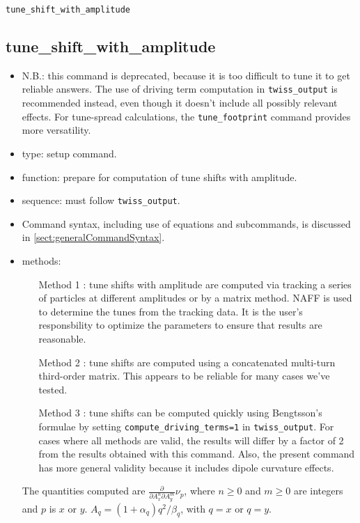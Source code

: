 \documentclass[11pt]{article}
\begin{document}
\newpage
\begin{center}{\Large\verb|tune_shift_with_amplitude|}\end{center}
\subsection{tune\_shift\_with\_amplitude \label{subsec:tuneshiftwithamplitude}}

\begin{itemize}
\item N.B.: this command is deprecated, because it is too difficult to tune it to get
  reliable answers. The use of driving term computation in \verb|twiss_output| is recommended instead, even though it 
  doesn't include all possibly relevant effects. For tune-spread calculations, the \verb|tune_footprint| command provides
  more versatility.
\item type: setup command.
\item function: prepare for computation of tune shifts with amplitude.
\item sequence: must follow \verb|twiss_output|.
\item Command syntax, including use of equations and subcommands, is discussed in \ref{sect:generalCommandSyntax}.
\item methods: 
\begin{itemize}
 \item[Method 1]: tune shifts with amplitude are computed via tracking a series of
  particles at different amplitudes or by a matrix method.  NAFF is used to 
  determine the tunes from the tracking data.  It is the user's responsbility to optimize the
  parameters to ensure that results are reasonable.  
 \item[Method 2]: tune shifts are computed using a concatenated multi-turn third-order matrix.
 This appears to be reliable for many cases we've tested.
 \item[Method 3]: tune shifts can be computed quickly using Bengtsson's formulae \cite{Bengtsson} by
 setting \verb|compute_driving_terms=1| in \verb|twiss_output|.  For cases where all methods are
 valid, the results will differ by a factor of 2 from the results obtained with this command.
 Also, the present command has more general validity because it includes dipole curvature effects.
\end{itemize}

The quantities computed are $\frac{\partial}{\partial A_x^n \partial A_y^m}\nu_p$, where $n\geq 0$ and $m \geq 0$ are
integers and $p$ is $x$ or $y$.  $A_q = (1 + \alpha_q) q^2/\beta_q$, with $q=x$ or $q=y$.

\end{itemize}
\end{document}
